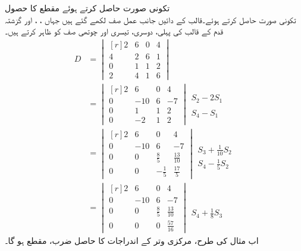 \quad تکونی صورت حاصل کرتے ہوئے مقطع کا حصول\\ 
تکونی صورت حاصل کرتے ہوئے۔قالب کے دائیں جانب عمل صف لکھے گئے ہیں جہاں ، ،   اور  گزشتہ قدم کے قالب کی پہلی، دوسری، تیسری اور چوتھی صف کو ظاہر کرتے ہیں۔
\begin{align*}
D&=
\begin{vmatrix*}[r]
2&6&0&4\\4&2&6&1\\0&1&1&2\\2&4&1&6
\end{vmatrix*}\\
&=
\begin{vmatrix*}[r]
2&6&0&4\\0&-10&6&-7\\0&1&1&2\\0&-2&1&2
\end{vmatrix*}
\begin{matrix}
\\  S_2-2S_1\\  \\ S_4-S_1
\end{matrix}\\
&=
\begin{vmatrix*}[r]
2&6&0&4\\[0.5ex]0&-10&6&-7\\[0.5ex]0&0&\frac{8}{5}&\frac{13}{10}\\[0.5ex]0&0&-\frac{1}{5}&\frac{17}{5}
\end{vmatrix*}
\begin{matrix}
\\[0.5ex]  \\[0.5ex]S_3+\frac{1}{10}S_2  \\[0.5ex] S_4-\frac{1}{5}S_2
\end{matrix}\\
&=
\begin{vmatrix*}[r]
2&6&0&4\\[0.5ex]0&-10&6&-7\\[0.5ex]0&0&\frac{8}{5}&\frac{13}{10}\\[0.5ex]0&0&0&\frac{57}{16}
\end{vmatrix*}
\begin{matrix}
\\[0.5ex]  \\[0.5ex]  \\[0.5ex] S_4+\frac{1}{8}S_3
\end{matrix}
\end{align*}
اب مثال  کی طرح، مرکزی وتر کے اندراجات کا حاصل ضرب، مقطع ہو گا۔
